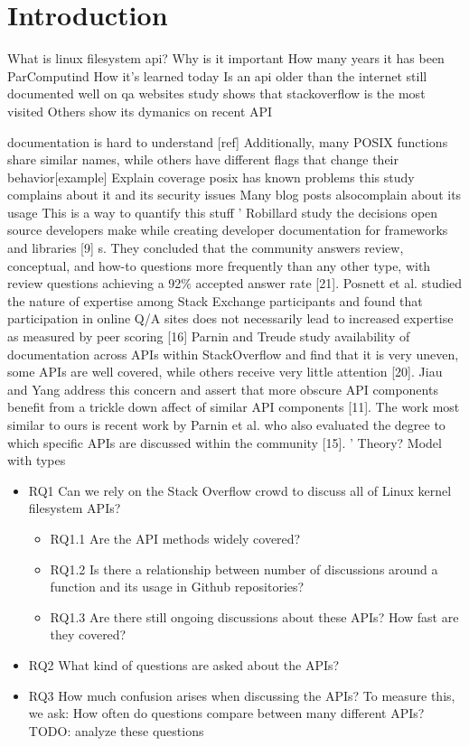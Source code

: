 \section{Introduction}

What is linux filesystem api?
Why is it important
How many years it has been ParComputind
How it's learned today
Is an api older than the internet still documented well on qa websites
study shows that stackoverflow is the most visited
Others show its dymanics on recent API


documentation is hard to understand [ref]
Additionally, many POSIX functions share similar names, while others have different flags that change their behavior[example]
Explain coverage
posix has known problems
this study complains about it and its security issues
Many blog posts alsocomplain about its usage
This is a way to quantify this stuff
'
Robillard study the decisions open source developers make while creating
developer documentation for frameworks and libraries [9]
s. They concluded that the community answers review, conceptual,
and how-to questions more frequently than any other type, with review questions
achieving a 92\% accepted answer rate [21]. Posnett et al. studied the nature of expertise
among Stack Exchange participants and found that participation in online Q/A sites
does not necessarily lead to increased expertise as measured by peer scoring [16]
Parnin and Treude study availability of documentation
across APIs within StackOverflow and find that it is very uneven, some APIs are well
covered, while others receive very little attention [20]. Jiau and Yang address this concern
and assert that more obscure API components benefit from a trickle down affect of
similar API components [11].
The work most similar to ours is recent work by Parnin et al. who also evaluated
the degree to which specific APIs are discussed within the community [15].
'
Theory?
Model with types

\begin{itemize}
  \item
  RQ1 Can we rely on the Stack Overflow crowd to discuss all of Linux kernel filesystem APIs?
  \begin{itemize}
    \item
    RQ1.1 Are the API methods widely covered?
    \item
    RQ1.2 Is there a relationship between number of discussions around a function and its usage in Github repositories?
    \item
    RQ1.3 Are there still ongoing discussions about these APIs? How fast are they covered?
  \end{itemize}
  \item
  RQ2 What kind of questions are asked about the APIs?
  \item
  RQ3 How much confusion arises when discussing the APIs? To measure this, we ask: How often do questions compare between many different APIs? TODO: analyze these questions
\end{itemize}

